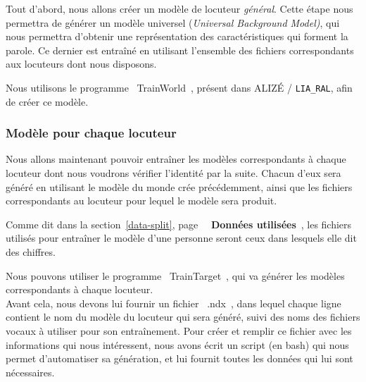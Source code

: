 \documentclass[a4paper, 12pt]{book}
\newcounter{program}[subsection]
\begin{document}
Tout d'abord, nous allons créer un modèle de locuteur \textit{général}. Cette étape nous permettra de générer un modèle universel (\textit{Universal Background Model)}, qui nous permettra d'obtenir une représentation des caractéristiques qui forment la parole. Ce dernier est entraîné en utilisant l'ensemble des fichiers correspondants aux locuteurs dont nous disposons. 

Nous utilisons le programme \guillemotleft{}~TrainWorld~\guillemotright{}, présent dans ALIZÉ / \texttt{LIA\_RAL}, afin de créer ce modèle.

\subsubsection{Modèle pour chaque locuteur}

Nous allons maintenant pouvoir entraîner les modèles correspondants à chaque locuteur dont nous voudrons vérifier l'identité par la suite.
Chacun d'eux sera généré en utilisant le modèle du monde crée précédemment, ainsi que les fichiers correspondants au locuteur pour lequel le modèle sera produit.

Comme dit dans la section~\ref{data-split}, page~\pageref{data-split} \guillemotleft{}~\textbf{Données utilisées}~\guillemotright{}, les fichiers utilisés pour entraîner le modèle d'une personne seront ceux dans lesquels elle dit des chiffres.

Nous pouvons utiliser le programme \guillemotleft{}~TrainTarget~\guillemotright{}, qui va générer les modèles correspondants à chaque locuteur.\\
Avant cela, nous devons lui fournir un fichier \guillemotleft{}~.ndx~\guillemotright{}, dans lequel chaque ligne contient le nom du modèle du locuteur qui sera généré, suivi des noms des fichiers vocaux à utiliser pour son entraînement. Pour créer et remplir ce fichier avec les informations qui nous intéressent, nous avons écrit un script (en bash) qui nous permet d'automatiser sa génération, et lui fournit toutes les données qui lui sont nécessaires.
\end{document}
